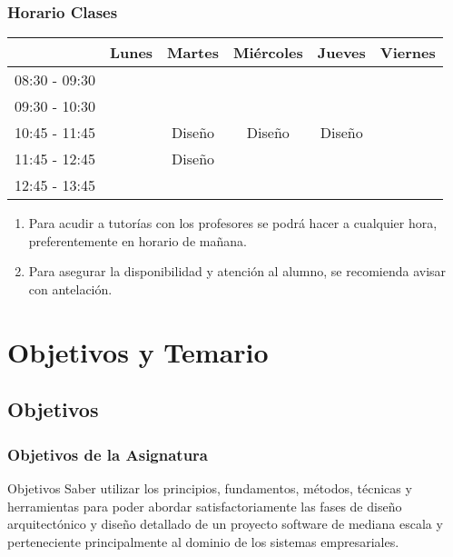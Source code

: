 \documentclass[animated,a4paper,slidestop,xcolor=pst,blue]{beamer}
\begin{document}
\begin{frame}[c]
	\frametitle{Horario Clases}
	\begin{small}
	\begin{center}
	\begin{tabular}{||l|c|c|c|c|c||}
	\hline \hline
				   & Lunes  & Martes  & Miércoles   & Jueves      & Viernes      \\ \hline \hline
    08:30 - 09:30  &        &         &             &             &              \\ \hline
	09:30 - 10:30  &        &         &             &             &              \\ \hline
	10:45 - 11:45  &        & Diseño  & Diseño      & Diseño      &              \\ \hline
	11:45 - 12:45  &        & Diseño  &             &             &              \\ \hline
	12:45 - 13:45  &        &         &             &             &              \\ \hline \hline
	\end{tabular}
	\end{center}
	\end{small}
    \begin{enumerate}
        \item<2-> Para acudir a tutorías con los profesores se podrá hacer a cualquier hora, preferentemente en horario de mañana.
        \item<3-> Para asegurar la disponibilidad y atención al alumno, se recomienda avisar con antelación.
    \end{enumerate}
\end{frame}

\section{Objetivos y Temario}

\subsection{Objetivos}

\begin{frame}[c]
	\frametitle{Objetivos de la Asignatura}
	\begin{block}{Objetivos}
        Saber utilizar los principios, fundamentos, métodos, técnicas y herramientas para poder abordar satisfactoriamente las fases de \alert{diseño arquitectónico} y \alert{diseño detallado} de un proyecto software de mediana escala y perteneciente principalmente al dominio de los sistemas empresariales.
	\end{block}
\end{frame}
\end{document}
